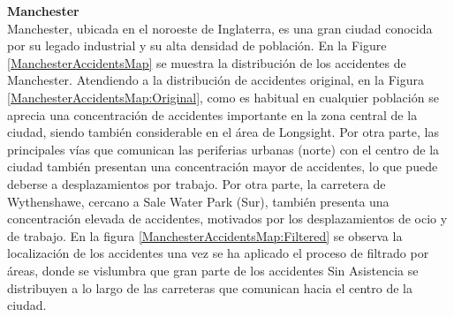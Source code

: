 \textbf{Manchester}\\

Manchester, ubicada en el noroeste de Inglaterra, es una gran ciudad conocida por su legado industrial y su alta densidad de población. En la Figure \ref{ManchesterAccidentsMap} se muestra la distribución de los accidentes de Manchester. Atendiendo a la distribución de accidentes original, en la Figura \ref{ManchesterAccidentsMap:Original}, como es habitual en cualquier población se aprecia una concentración de accidentes importante en la zona central de la ciudad, siendo también considerable en el área de Longsight. Por otra parte, las principales vías que comunican las periferias urbanas (norte) con el centro de la ciudad también presentan una concentración mayor de accidentes, lo que puede deberse a desplazamientos por trabajo. Por otra parte, la carretera de Wythenshawe, cercano a Sale Water Park (Sur), también presenta una concentración elevada de accidentes, motivados por los desplazamientos de ocio y de trabajo. En la figura \ref{ManchesterAccidentsMap:Filtered} se observa la localización de los accidentes una vez se ha aplicado el proceso de filtrado por áreas, donde se vislumbra que gran parte de los accidentes Sin Asistencia se distribuyen a lo largo de las carreteras que comunican hacia el centro de la ciudad.


